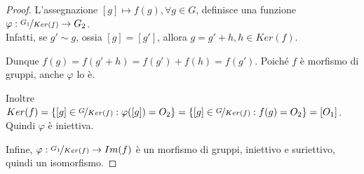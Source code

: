 \documentclass[../main.tex]{subfiles}
\begin{document}
\begin{proof}
    L'assegnazione $[g] \mapsto f(g), \forall g \in  G$, definisce una funzione $\varphi : \nicefrac{G_1}{Ker(f)}
        \rightarrow G_2$.\\
    Infatti, se $g' \sim g$, ossia $[g]  = [g']$, allora $g = g' + h , h \in Ker(f)$.

    Dunque $f(g) = f(g' + h) = f(g') + f(h) = f(g')$. Poiché $f$ è morfismo di gruppi, anche $\varphi$ lo è.

    Inoltre $Ker(f) = \{[g] \in \nicefrac{G}{Ker(f)} : \varphi([g]) = O_2\}=\{[g] \in  \nicefrac{G}{Ker(f)} : f(g) = O_2\} = {[O_1]}$. Quindi $\varphi$ è iniettiva.

    Infine, $ \varphi : \nicefrac{G_1}{Ker(f)} \rightarrow Im(f)$ è un morfismo di gruppi, iniettivo e suriettivo, quindi un isomorfismo.
\end{proof}
\end{document}

